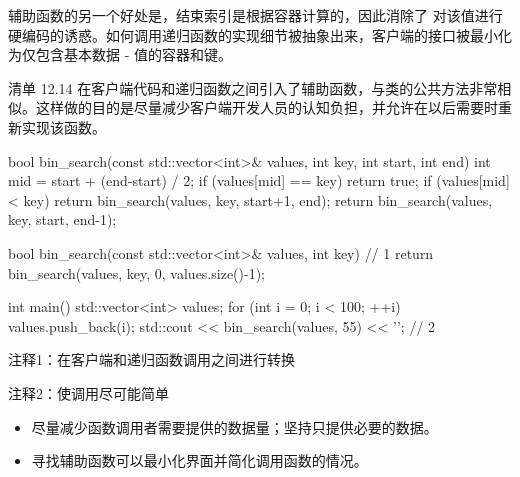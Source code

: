辅助函数的另一个好处是，结束索引是根据容器计算的，因此消除了 对该值进行硬编码的诱惑。如何调用递归函数的实现细节被抽象出来，客户端的接口被最小化为仅包含基本数据 - 值的容器和键。

清单 12.14 在客户端代码和递归函数之间引入了辅助函数，与类的公共方法非常相似。这样做的目的是尽量减少客户端开发人员的认知负担，并允许在以后需要时重新实现该函数。


\begin{cpp}
bool bin_search(const std::vector<int>& values, int key, int start, int end) {
  int mid = start + (end-start) / 2;
  if (values[mid] == key)
    return true;
  if (values[mid] < key)
    return bin_search(values, key, start+1, end);
  return bin_search(values, key, start, end-1);
}

bool bin_search(const std::vector<int>& values, int key) { // 1
  return bin_search(values, key, 0, values.size()-1);
}

int main() {
  std::vector<int> values;
  for (int i = 0; i < 100; ++i)
    values.push_back(i);
  std::cout << bin_search(values, 55) << '\n'; // 2
}
\end{cpp}

{\footnotesize
注释1：在客户端和递归函数调用之间进行转换

注释2：使调用尽可能简单
}


\begin{itemize}
\item
尽量减少函数调用者需要提供的数据量；坚持只提供必要的数据。

\item
寻找辅助函数可以最小化界面并简化调用函数的情况。
\end{itemize}









